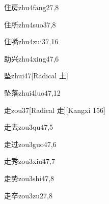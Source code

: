 \begin{verbete}{住房}{zhu4fang2}{7,8}
\end{verbete}

\begin{verbete}{住所}{zhu4suo3}{7,8}
\end{verbete}

\begin{verbete}{住嘴}{zhu4zui3}{7,16}
\end{verbete}

\begin{verbete}{助兴}{zhu4xing4}{7,6}
\end{verbete}

\begin{verbete}{坠}{zhui4}{7}[Radical 土]
\end{verbete}

\begin{verbete}{坠落}{zhui4luo4}{7,12}
\end{verbete}

\begin{verbete}{走}{zou3}{7}[Radical 走][Kangxi 156]
\end{verbete}

\begin{verbete}{走去}{zou3qu4}{7,5}
\end{verbete}

\begin{verbete}{走过}{zou3guo4}{7,6}
\end{verbete}

\begin{verbete}{走秀}{zou3xiu4}{7,7}
\end{verbete}

\begin{verbete}{走势}{zou3shi4}{7,8}
\end{verbete}

\begin{verbete}{走卒}{zou3zu2}{7,8}
\end{verbete}

